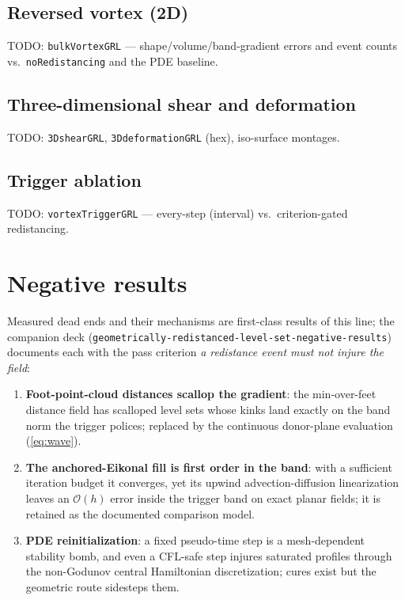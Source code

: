 \documentclass[preprint,3p,11pt]{elsarticle}
\begin{document}
\subsection{Reversed vortex (2D)}
TODO: \texttt{bulkVortexGRL} — shape/volume/band-gradient errors and event
counts vs.\ \texttt{noRedistancing} and the PDE baseline.
% 

\subsection{Three-dimensional shear and deformation}
TODO: \texttt{3DshearGRL}, \texttt{3DdeformationGRL} (hex), iso-surface
montages.

\subsection{Trigger ablation}
TODO: \texttt{vortexTriggerGRL} — every-step (interval) vs.\ criterion-gated
redistancing.

\section{Negative results}
\label{sec:negative}
Measured dead ends and their mechanisms are first-class results of this
line; the companion deck (\texttt{geometrically-redistanced-level-set-negative-results}) documents each with
the pass criterion \emph{a redistance event must not injure the field}:
\begin{enumerate}
  \item \textbf{Foot-point-cloud distances scallop the gradient}: the
    min-over-feet distance field has scalloped level sets whose kinks land
    exactly on the band norm the trigger polices; replaced by the continuous
    donor-plane evaluation (\ref{eq:wave}).
  \item \textbf{The anchored-Eikonal fill is first order in the band}: with
    a sufficient iteration budget it converges, yet its upwind
    advection-diffusion linearization \cite{tucker2003} leaves an
    $\mathcal{O}(h)$ error inside the trigger band on exact planar fields;
    it is retained as the documented comparison model.
  \item \textbf{PDE reinitialization}: a fixed pseudo-time step is a
    mesh-dependent stability bomb, and even a CFL-safe step injures
    saturated profiles through the non-Godunov central Hamiltonian
    discretization; cures exist \cite{russo2000} but the geometric route
    sidesteps them.
\end{enumerate}
\end{document}
